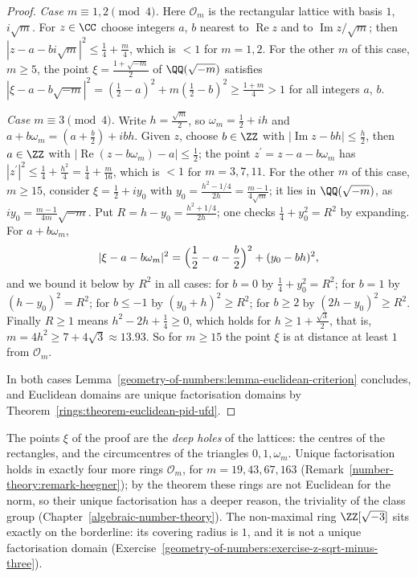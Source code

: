 \begin{proof}
\emph{Case $m \equiv 1, 2 \pmod 4$.} Here $\mathcal{O}_m$ is the rectangular lattice with basis $1$, $i\sqrt m$. For $z \in \CC$ choose integers $a$, $b$ nearest to $\operatorname{Re}z$ and to
$\operatorname{Im}z/\sqrt m$; then $|z - a - bi\sqrt m|^2 \leq \frac14 + \frac m4$, which is $< 1$ for $m = 1, 2$. For the other $m$ of this case, $m \geq 5$, the point $\xi = \frac{1 + \sqrt{-m}}{2}$ of
$\QQ(\sqrt{-m})$ satisfies $|\xi - a - b\sqrt{-m}|^2 = (\frac12 - a)^2 + m(\frac12 - b)^2 \geq \frac{1 + m}{4} > 1$ for all integers $a$, $b$.

\emph{Case $m \equiv 3 \pmod 4$.} Write $h = \frac{\sqrt m}{2}$, so $\omega_m = \frac12 + ih$ and $a + b\omega_m = (a + \frac b2) + ibh$. Given $z$, choose $b \in \ZZ$ with $|\operatorname{Im}z - bh| \leq \frac h2$, then
$a \in \ZZ$ with $|\operatorname{Re}(z - b\omega_m) - a| \leq \frac12$; the point $z^{\prime} = z - a - b\omega_m$ has $|z^{\prime}|^2 \leq \frac14 + \frac{h^2}{4} = \frac14 + \frac{m}{16}$, which is $< 1$ for
$m = 3, 7, 11$. For the other $m$ of this case, $m \geq 15$, consider $\xi = \frac12 + iy_0$ with $y_0 = \frac{h^2 - 1/4}{2h} = \frac{m - 1}{4\sqrt m}$; it lies in $\QQ(\sqrt{-m})$, as
$iy_0 = \frac{m - 1}{4m}\sqrt{-m}$. Put $R = h - y_0 = \frac{h^2 + 1/4}{2h}$; one checks $\frac14 + y_0^2 = R^2$ by expanding. For $a + b\omega_m$,
\[
|\xi - a - b\omega_m|^2 = \Bigl(\frac12 - a - \frac b2\Bigr)^2 + (y_0 - bh)^2,
\]
and we bound it below by $R^2$ in all cases: for $b = 0$ by $\frac14 + y_0^2 = R^2$; for $b = 1$ by $(h - y_0)^2 = R^2$; for $b \leq -1$ by $(y_0 + h)^2 \geq R^2$; for $b \geq 2$ by $(2h - y_0)^2 \geq R^2$.
Finally $R \geq 1$ means $h^2 - 2h + \frac14 \geq 0$, which holds for $h \geq 1 + \frac{\sqrt3}{2}$, that is, $m = 4h^2 \geq 7 + 4\sqrt3 \approx 13.93$. So for $m \geq 15$ the point $\xi$ is at distance at least $1$ from
$\mathcal{O}_m$.

In both cases Lemma~\ref{geometry-of-numbers:lemma-euclidean-criterion} concludes, and Euclidean domains are unique factorisation domains by Theorem~\ref{rings:theorem-euclidean-pid-ufd}.
\end{proof}

\begin{remark}\label{geometry-of-numbers:remark-euclidean}
The points $\xi$ of the proof are the \emph{deep holes} of the lattices: the centres of the rectangles, and the circumcentres of the triangles $0, 1, \omega_m$. Unique factorisation holds in exactly four
more rings $\mathcal{O}_m$, for $m = 19, 43, 67, 163$ (Remark~\ref{number-theory:remark-heegner}); by the theorem these rings are not Euclidean for the norm, so their unique factorisation has a
deeper reason, the triviality of the class group (Chapter~\ref{algebraic-number-theory}). The non-maximal ring $\ZZ[\sqrt{-3}]$ sits exactly on the borderline: its covering radius is $1$, and it is not a
unique factorisation domain (Exercise~\ref{geometry-of-numbers:exercise-z-sqrt-minus-three}).
\end{remark}


